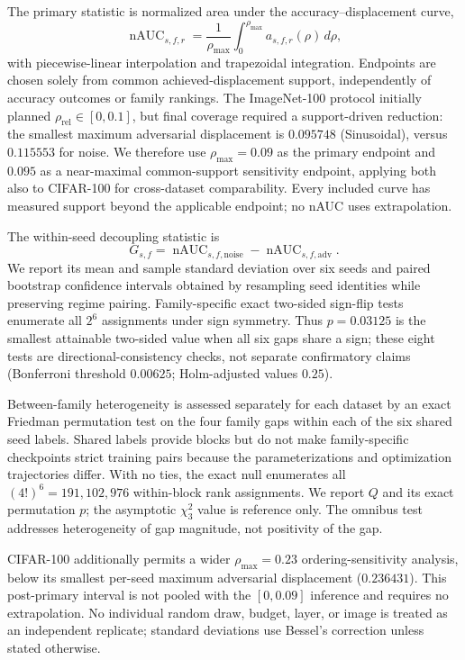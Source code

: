 \documentclass[preprint,12pt,authoryear]{elsarticle}
\begin{document}
The primary statistic is normalized area under the
accuracy--displacement curve,
\begin{equation}
\operatorname{nAUC}_{s,f,r}
=
\frac{1}{\rho_{\max}}
\int_{0}^{\rho_{\max}}
a_{s,f,r}(\rho)\,d\rho,
\label{eq:seed-nauc}
\end{equation}
with piecewise-linear interpolation and trapezoidal integration. Endpoints are
chosen solely from common achieved-displacement support, independently of
accuracy outcomes or family rankings. The ImageNet-100 protocol initially
planned $\rho_{\mathrm{rel}}\in[0,0.1]$, but final coverage required a
support-driven reduction: the smallest maximum adversarial displacement is
$0.095748$ (Sinusoidal), versus $0.115553$ for noise. We therefore use
$\rho_{\max}=0.09$ as the primary endpoint and $0.095$ as a near-maximal
common-support sensitivity endpoint, applying both also to CIFAR-100 for
cross-dataset comparability. Every included curve has measured support beyond
the applicable endpoint; no nAUC uses extrapolation.

The within-seed decoupling statistic is
\begin{equation}
G_{s,f}
=
\operatorname{nAUC}_{s,f,\mathrm{noise}}
-
\operatorname{nAUC}_{s,f,\mathrm{adv}}.
\label{eq:auc-gap}
\end{equation}
We report its mean and sample standard deviation over six seeds and paired
bootstrap confidence intervals obtained by resampling seed identities while
preserving regime pairing. Family-specific exact two-sided sign-flip tests
enumerate all $2^6$ assignments under sign symmetry. Thus $p=0.03125$ is the
smallest attainable two-sided value when all six gaps share a sign; these
eight tests are directional-consistency checks, not separate confirmatory
claims (Bonferroni threshold $0.00625$; Holm-adjusted values $0.25$).

Between-family heterogeneity is assessed separately for each dataset by an
exact Friedman permutation test on the four family gaps within each of the six
shared seed labels. Shared labels provide blocks but do not make
family-specific checkpoints strict training pairs because the
parameterizations and optimization trajectories differ. With no ties, the
exact null enumerates all $(4!)^6=191{,}102{,}976$ within-block rank
assignments. We report $Q$ and its exact permutation $p$; the asymptotic
$\chi^2_3$ value is reference only. The omnibus test addresses heterogeneity
of gap magnitude, not positivity of the gap.

CIFAR-100 additionally permits a wider $\rho_{\max}=0.23$ ordering-sensitivity
analysis, below its smallest per-seed maximum adversarial displacement
($0.236431$). This post-primary interval is not pooled with the
$[0,0.09]$ inference and requires no extrapolation. No individual random draw,
budget, layer, or image is treated as an independent replicate; standard
deviations use Bessel's correction unless stated otherwise.
\end{document}

